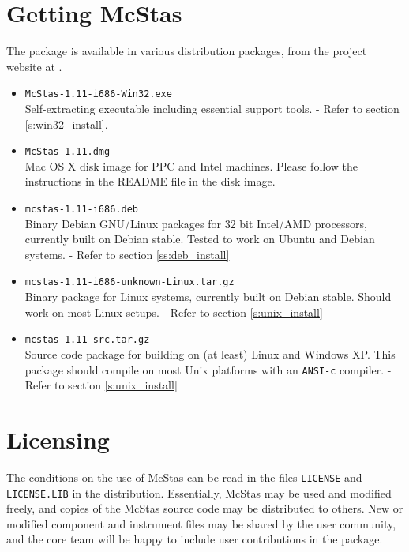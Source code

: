 \label{s:install}

\section{Getting McStas}
\label{s:obtain}
The  package is
available in various distribution packages, from the project
website at
.
\begin{itemize}
\item{\texttt{McStas-1.11-i686-Win32.exe}\\Self-extracting executable
    including essential support tools. - Refer to section
    \ref{s:win32_install}. }
\item{\texttt{McStas-1.11.dmg}\\Mac OS X disk image for PPC and Intel machines. Please follow
    the instructions in the README file in the disk image. }
\item{\texttt{mcstas-1.11-i686.deb}\\Binary Debian GNU/Linux packages for 32 bit Intel/AMD processors, currently built on Debian stable.
   Tested to work on Ubuntu and Debian systems.
 - Refer to section \ref{ss:deb_install}}
\item{\texttt{mcstas-1.11-i686-unknown-Linux.tar.gz}\\Binary package
  for Linux systems, currently built on Debian stable.
  Should work on most Linux setups.
 - Refer to section \ref{s:unix_install}}
\item{\texttt{mcstas-1.11-src.tar.gz}\\Source code package for
    building  on
    (at least) Linux and Windows XP. This package should compile on
    most Unix platforms with an \texttt{ANSI-c} compiler. - Refer to section \ref{s:unix_install}}
\end{itemize}

\section{Licensing}
The conditions on the use of McStas can be read in the files
\verb+LICENSE+ and \verb+LICENSE.LIB+ in the distribution. Essentially,
McStas may be used and modified freely, and copies of the McStas source code
may be distributed to others.
New or modified component and instrument files may be shared by
the user community, and the core team will be happy to include user contributions in the package.

